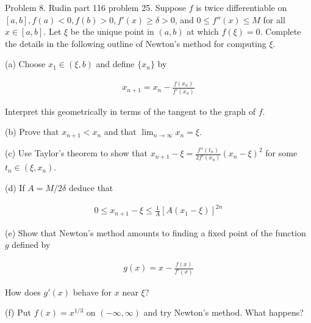 \documentclass{article}
\begin{document}
  \vspace{1cm}

  \pagebreak

  {\Large \color{Sepia} Problem 8. Rudin part 116 problem 25. Suppose $f$ is twice differentiable on $[a,b], f(a)<0, f(b)>0, f'(x)\geq \delta>0$, and $0\leq f''(x)\leq M$ for all $x\in[a,b]$.  Let $\xi$ be the unique point in $(a,b)$ at which $f(\xi)=0.$  Complete the details in the following outline of Newton's method for computing $\xi$.

  (a) Choose $x_1\in (\xi,b)$ and define $\{x_n\}$ by

  \begin{align*}
    x_{n+1}=x_n-\frac{f(x_n)}{f'(x_n)}
  \end{align*}

  Interpret this geometrically in terms of the tangent to the graph of $f$.}

  \vspace{1cm}

  \vspace{1cm}

  {\Large \color{Sepia} (b) Prove that $x_{n+1}<x_n$ and that $\lim_{n\to \infty}x_n=\xi$.}

  \vspace{1cm}

  \vspace{1cm}

  {\Large \color{Sepia} (c) Use Taylor's theorem to show that $x_{n+1}-\xi = \frac{f''(t_n)}{2f'(x_n)}(x_n-\xi)^2$ for some $t_n\in(\xi,x_n)$.}

  \vspace{1cm}

  \vspace{1cm}

  {\Large \color{Sepia} (d) If $A=M/2\delta$ deduce that

  \begin{align*}
    0\leq x_{n+1}-\xi \leq \frac 1 A [A(x_1-\xi)]^{2n}
  \end{align*}}

  \vspace{1cm}

  \vspace{1cm}

  {\Large \color{Sepia} (e) Show that Newton's method amounts to finding a fixed point of the function $g$ defined by

  \begin{align*}
    g(x) = x-\frac{f(x)}{f'(x)}
  \end{align*}

  How does $g'(x)$ behave for $x$ near $\xi$?}

  \vspace{1cm}

  \vspace{1cm}

  {\Large \color{Sepia} (f) Put $f(x)=x^{1/3}$ on $(-\infty,\infty)$ and try Newton's method.  What happens?}

  \vspace{1cm}

  \pagebreak
\end{document}
